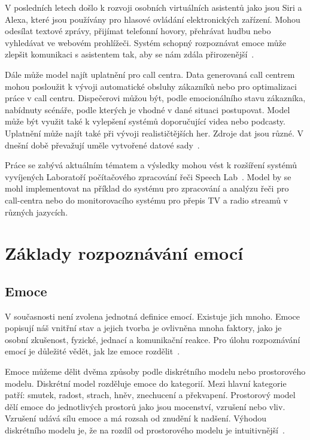 \documentclass[FM,BP]{tulthesis}
\newcommand{\change}[1]{\todo[color=red!40]{#1}}
\begin{document}
V posledních letech došlo k rozvoji osobních virtuálních asistentů jako jsou Siri a Alexa, které jsou používány pro hlasové ovládání elektronických zařízení. Mohou odesílat textové zprávy, přijímat telefonní hovory, přehrávat hudbu nebo vyhledávat ve webovém prohlížeči. Systém schopný rozpoznávat emoce může zlepšit komunikaci s asistentem tak, aby se nám zdála přirozenější~\cite{DBLP:journals/corr/abs-1912-10458}.

Dále může model najít uplatnění pro call centra. Data generovaná call centrem mohou posloužit k vývoji automatické obsluhy zákazníků nebo pro optimalizaci práce v call centru. Dispečerovi můžou být, podle emocionálního stavu zákazníka, nabídnuty scénáře, podle kterých je vhodné v dané situaci postupovat. Model může být využit také k vylepšení systémů doporučující videa nebo podcasty. Uplatnění může najít také při vývoji realističtějších her. Zdroje dat jsou různé. V dnešní době převažují uměle vytvořené datové sady~\cite{konar_chakraborty_2015}.

Práce se zabývá aktuálním tématem a výsledky mohou vést k rozšíření systémů vyvíjených Laboratoří počítačového zpracování řeči Speech Lab~\cite{speechlab}. \change{rovná se}
Model by se mohl implementovat na příklad do systému pro zpracování a analýzu řeči pro call-centra nebo do monitorovacího systému pro přepis TV a radio streamů v různých jazycích.

\chapter{Základy rozpoznávání emocí}

\section{Emoce} %
V současnosti není zvolena jednotná definice emocí. Existuje jich mnoho. Emoce popisují náš vnitřní stav a jejich tvorba je ovlivněna mnoha faktory, jako je osobní zkušenost, fyzické, jednací a komunikační reakce. Pro úlohu rozpoznávání emocí je důležité vědět, jak lze emoce rozdělit~\cite{DBLP:journals/speech/AkcayO20}.

Emoce můžeme dělit dvěma způsoby podle diskrétního modelu nebo prostorového modelu. Diskrétní model rozděluje emoce do kategorií. Mezi hlavní kategorie patří: smutek, radost, strach, hněv, znechucení a překvapení. Prostorový model dělí emoce do jednotlivých prostorů jako jsou mocenství, vzrušení nebo vliv. Vzrušení udává sílu emoce a má rozsah od znudění k nadšení. Výhodou diskrétního modelu je, že na rozdíl od prostorového modelu je intuitivnější~\cite{DBLP:journals/speech/AkcayO20}.
\end{document}
